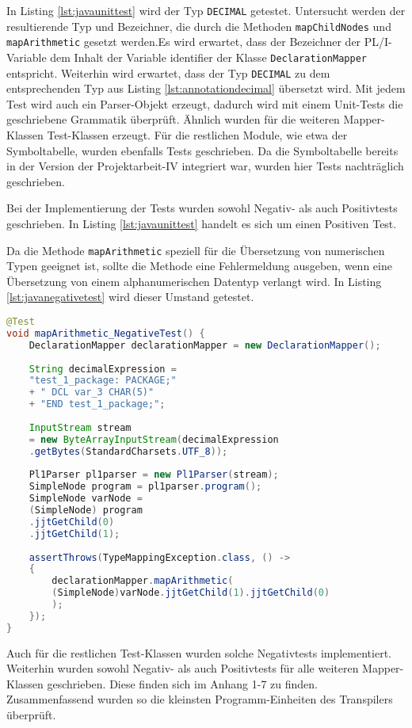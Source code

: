 In Listing \ref{lst:javaunittest}  wird der Typ \verb+DECIMAL+ getestet. Untersucht werden der resultierende Typ und Bezeichner, die durch die Methoden \verb+mapChildNodes+ und \verb+mapArithmetic+ gesetzt werden.Es wird erwartet, dass der Bezeichner der PL/I-Variable dem Inhalt der Variable identifier der Klasse \verb+DeclarationMapper+ entspricht.
Weiterhin wird erwartet, dass der Typ \verb+DECIMAL+ zu dem entsprechenden Typ aus Listing \ref{lst:annotationdecimal} übersetzt wird.
Mit jedem Test wird auch ein Parser-Objekt erzeugt, dadurch wird  mit einem Unit-Tests die geschriebene Grammatik überprüft.
Ähnlich wurden  für die weiteren Mapper-Klassen Test-Klassen erzeugt.
Für die restlichen Module, wie etwa der Symboltabelle, wurden ebenfalls Tests geschrieben.
Da die Symboltabelle bereits in der Version der Projektarbeit-IV integriert war, wurden hier  Tests nachträglich geschrieben. 

Bei der Implementierung der Tests wurden sowohl Negativ- als auch Positivtests geschrieben.
In Listing \ref{lst:javaunittest} handelt es sich um einen Positiven Test. 

Da die Methode \verb+mapArithmetic+ speziell für die Übersetzung von numerischen Typen geeignet ist, sollte die Methode eine Fehlermeldung ausgeben, wenn eine Übersetzung von einem alphanumerischen Datentyp verlangt wird.  In Listing \ref{lst:javanegativetest} wird dieser Umstand getestet. 

\begin{lstlisting}[language=Java, caption=Arithmetic Node Unit-test, label={lst:javanegativetest}]
@Test
void mapArithmetic_NegativeTest() {
	DeclarationMapper declarationMapper = new DeclarationMapper();
	
	String decimalExpression = 
	"test_1_package: PACKAGE;" 
	+ "	DCL var_3 CHAR(5)" 
	+ "END test_1_package;";
	
	InputStream stream
	= new ByteArrayInputStream(decimalExpression
	.getBytes(StandardCharsets.UTF_8));
		
	Pl1Parser pl1parser = new Pl1Parser(stream);
	SimpleNode program = pl1parser.program();
	SimpleNode varNode = 
	(SimpleNode) program
	.jjtGetChild(0)
	.jjtGetChild(1);
		
	assertThrows(TypeMappingException.class, () -> 
	{
		declarationMapper.mapArithmetic(
		(SimpleNode)varNode.jjtGetChild(1).jjtGetChild(0)
		);
	});
}
\end{lstlisting}

Auch für die restlichen Test-Klassen wurden solche Negativtests implementiert. 
Weiterhin wurden sowohl Negativ- als auch Positivtests für alle weiteren Mapper-Klassen geschrieben. Diese finden sich im Anhang 1-7 zu finden.
Zusammenfassend wurden so die kleinsten Programm-Einheiten des Transpilers überprüft. 
\pagebreak

